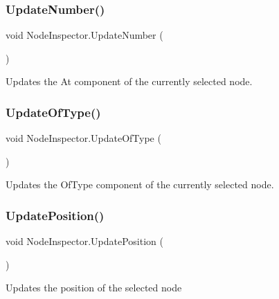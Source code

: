 \subsubsection{\texorpdfstring{Update\+Number()}{UpdateNumber()}}
{\footnotesize\ttfamily void Node\+Inspector.\+Update\+Number (\begin{DoxyParamCaption}{ }\end{DoxyParamCaption})}



Updates the At component of the currently selected node. 

\mbox{\label{class_node_inspector_acbb1e1d49e8e382ea41c9685bb31f978}} 
\subsubsection{\texorpdfstring{Update\+Of\+Type()}{UpdateOfType()}}
{\footnotesize\ttfamily void Node\+Inspector.\+Update\+Of\+Type (\begin{DoxyParamCaption}{ }\end{DoxyParamCaption})}



Updates the Of\+Type component of the currently selected node. 

\mbox{\label{class_node_inspector_a7d2d42f0b36ed545ee032cce4373ac82}} 
\subsubsection{\texorpdfstring{Update\+Position()}{UpdatePosition()}}
{\footnotesize\ttfamily void Node\+Inspector.\+Update\+Position (\begin{DoxyParamCaption}{ }\end{DoxyParamCaption})}



Updates the position of the selected node 

\mbox{\label{class_node_inspector_a700b7af667de0b1d5bbdca2051ae74c6}} 
